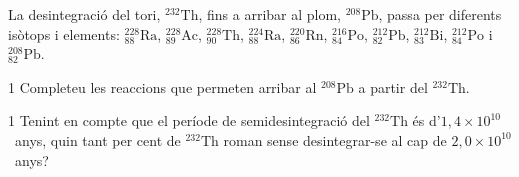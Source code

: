 La desintegració del tori, $^{232}\mathrm{Th}$, fins a arribar al plom, $^{208}\mathrm{Pb}$, passa per diferents isòtops i elements: ${}^{228}_{88}\mathrm{Ra}$, ${}^{228}_{89}\mathrm{Ac}$, ${}^{228}_{90}\mathrm{Th}$, ${}^{224}_{88}\mathrm{Ra}$, ${}^{220}_{86}\mathrm{Rn}$, ${}^{216}_{84}\mathrm{Po}$, ${}^{212}_{82}\mathrm{Pb}$, ${}^{212}_{83}\mathrm{Bi}$, ${}^{212}_{84}\mathrm{Po}$ i ${}^{208}_{82}\mathrm{Pb}$.

\begin{apartat}{1}
Completeu les reaccions que permeten arribar al $^{208}\mathrm{Pb}$ a partir del $^{232}\mathrm{Th}$.
\end{apartat}

\begin{apartat}{1}
Tenint en compte que el període de semidesintegració del $^{232}\mathrm{Th}$ és d'$1,4\times 10^{10}$~anys, quin tant per cent de $^{232}\mathrm{Th}$ roman sense desintegrar-se al cap de $2,0\times 10^{10}$~anys?
\end{apartat}
